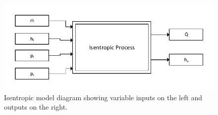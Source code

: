 \begin{figure}[h]
	\centering

	\includegraphics[width=\textwidth]{figures/IsentropeBlock.pdf} 

	\caption{Isentropic model diagram showing variable inputs on the left and outputs on the right.}
	\label{fig:isentropeblock_label}

\end{figure}
